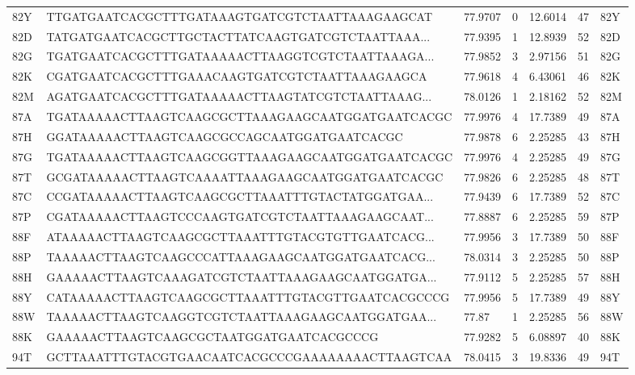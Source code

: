 \begin{tabular}{lllllll}
82Y &    TTGATGAATCACGCTTTGATAAAGTGATCGTCTAATTAAAGAAGCAT &  77.9707 &         0 &   12.6014 &     47 &  82Y \\
82D &  TATGATGAATCACGCTTGCTACTTATCAAGTGATCGTCTAATTAAA... &  77.9395 &         1 &   12.8939 &     52 &  82D \\
82G &  TGATGAATCACGCTTTGATAAAAACTTAAGGTCGTCTAATTAAAGA... &  77.9852 &         3 &   2.97156 &     51 &  82G \\
82K &     CGATGAATCACGCTTTGAAACAAGTGATCGTCTAATTAAAGAAGCA &  77.9618 &         4 &   6.43061 &     46 &  82K \\
82M &  AGATGAATCACGCTTTGATAAAAACTTAAGTATCGTCTAATTAAAG... &  78.0126 &         1 &   2.18162 &     52 &  82M \\
87A &  TGATAAAAACTTAAGTCAAGCGCTTAAAGAAGCAATGGATGAATCACGC &  77.9976 &         4 &   17.7389 &     49 &  87A \\
87H &        GGATAAAAACTTAAGTCAAGCGCCAGCAATGGATGAATCACGC &  77.9878 &         6 &   2.25285 &     43 &  87H \\
87G &  TGATAAAAACTTAAGTCAAGCGGTTAAAGAAGCAATGGATGAATCACGC &  77.9976 &         4 &   2.25285 &     49 &  87G \\
87T &   GCGATAAAAACTTAAGTCAAAATTAAAGAAGCAATGGATGAATCACGC &  77.9826 &         6 &   2.25285 &     48 &  87T \\
87C &  CCGATAAAAACTTAAGTCAAGCGCTTAAATTTGTACTATGGATGAA... &  77.9439 &         6 &   17.7389 &     52 &  87C \\
87P &  CGATAAAAACTTAAGTCCCAAGTGATCGTCTAATTAAAGAAGCAAT... &  77.8887 &         6 &   2.25285 &     59 &  87P \\
88F &  ATAAAAACTTAAGTCAAGCGCTTAAATTTGTACGTGTTGAATCACG... &  77.9956 &         3 &   17.7389 &     50 &  88F \\
88P &  TAAAAACTTAAGTCAAGCCCATTAAAGAAGCAATGGATGAATCACG... &  78.0314 &         3 &   2.25285 &     50 &  88P \\
88H &  GAAAAACTTAAGTCAAAGATCGTCTAATTAAAGAAGCAATGGATGA... &  77.9112 &         5 &   2.25285 &     57 &  88H \\
88Y &  CATAAAAACTTAAGTCAAGCGCTTAAATTTGTACGTTGAATCACGCCCG &  77.9956 &         5 &   17.7389 &     49 &  88Y \\
88W &  TAAAAACTTAAGTCAAGGTCGTCTAATTAAAGAAGCAATGGATGAA... &    77.87 &         1 &   2.25285 &     56 &  88W \\
88K &           GAAAAACTTAAGTCAAGCGCTAATGGATGAATCACGCCCG &  77.9282 &         5 &   6.08897 &     40 &  88K \\
94T &  GCTTAAATTTGTACGTGAACAATCACGCCCGAAAAAAAACTTAAGTCAA &  78.0415 &         3 &   19.8336 &     49 &  94T \\

\end{tabular}
